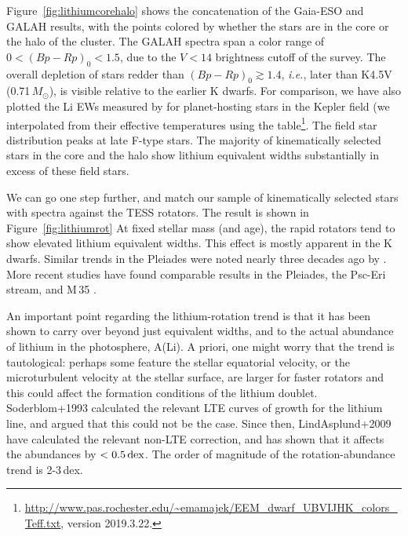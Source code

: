 \documentclass[12pt,twocolumn,tighten]{aastex63}
\newcommand{\cn}{NGC\,2516} %
\begin{document}
Figure~\ref{fig:lithiumcorehalo} shows the concatenation of the
Gaia-ESO and GALAH results, with the points colored by whether the
stars are in the core or the halo of the cluster.  The GALAH spectra
span a color range of $0<(Bp-Rp)_0<1.5$, due to the $V<14$ brightness
cutoff of the survey.  The overall depletion of stars redder than
$(Bp-Rp)_0\gtrsim1.4$, {\it i.e.}, later than K4.5V (0.71\,$M_\odot$),
is visible relative to the earlier K dwarfs.  For comparison, we have
also plotted the Li EWs measured by \citet{berger_identifying_2018}
for planet-hosting stars in the Kepler field (we interpolated from
their effective temperatures using the \citet{pecaut_mamajek_2013}
table\footnote{\url{http://www.pas.rochester.edu/~emamajek/EEM_dwarf_UBVIJHK_colors_Teff.txt},
version 2019.3.22.}.
The field star distribution peaks at late F-type stars.
The majority of kinematically selected stars in the core and the halo
show lithium equivalent widths substantially in excess of these field
stars.

We can go one step further, and match our sample of kinematically
selected stars with spectra against the TESS rotators.
The result is shown in Figure~\ref{fig:lithiumrot}
At fixed stellar mass
(and age), the rapid rotators tend to show elevated lithium equivalent
widths. This effect is mostly apparent in the K dwarfs.  Similar
trends in the Pleiades were noted nearly three decades ago by
\citet{soderblom_evolution_1993}.  More recent studies have found
comparable results in the Pleiades, the Psc-Eri stream, and M\,35
\citep{bouvier_pleiades_lirot_2018,arancibia_2020,jeffries_m35_li_2020}.



An important point regarding the lithium-rotation trend is that it has
been shown to carry over beyond just equivalent widths, and to the
actual abundance of lithium in the photosphere, A(Li).  A priori, one
might worry that the trend is tautological: perhaps some feature the
stellar equatorial velocity, or the microturbulent velocity at the
stellar surface, are larger for faster rotators and this could affect
the formation conditions of the lithium doublet.
Soderblom+1993 calculated the relevant LTE curves of growth for the
lithium line, and argued that this could not be the case.
Since then, LindAsplund+2009 have calculated the relevant non-LTE
correction, and has shown that it affects the abundances by
$<0.5\,{\rm dex}$.
The order of magnitude of the rotation-abundance trend is 2-3\,dex.
\end{document}
